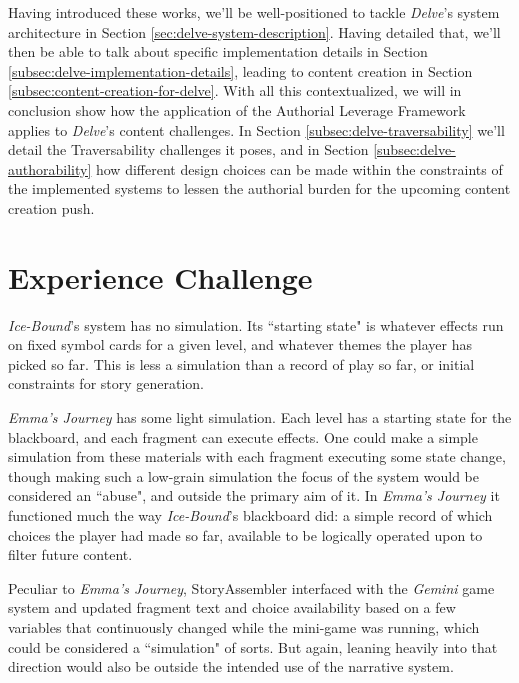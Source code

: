 Having introduced these works, we'll be well-positioned to tackle \textit{Delve}'s system architecture in Section \ref{sec:delve-system-description}. Having detailed that, we'll then be able to talk about specific implementation details in Section \ref{subsec:delve-implementation-details}, leading to content creation in Section \ref{subsec:content-creation-for-delve}. With all this contextualized, we will in conclusion show how the application of the Authorial Leverage Framework applies to \textit{Delve}'s content challenges. In Section \ref{subsec:delve-traversability} we'll detail the Traversability challenges it poses, and in Section \ref{subsec:delve-authorability} how different design choices can be made within the constraints of the implemented systems to lessen the authorial burden for the upcoming content creation push.

\section{Experience Challenge}\label{sec:delve-experience-challenge}

\textit{Ice-Bound}'s system has no simulation. Its ``starting state" is whatever effects run on fixed symbol cards for a given level, and whatever themes the player has picked so far. This is less a simulation than a record of play so far, or initial constraints for story generation.

\textit{Emma's Journey} has some light simulation. Each level has a starting state for the blackboard, and each fragment can execute effects. One could make a simple simulation from these materials with each fragment executing some state change, though making such a low-grain simulation the focus of the system would be considered an ``abuse", and outside the primary aim of it. In \textit{Emma's Journey} it functioned much the way \textit{Ice-Bound}'s blackboard did: a simple record of which choices the player had made so far, available to be logically operated upon to filter future content. 

Peculiar to \textit{Emma's Journey}, StoryAssembler interfaced with the \textit{Gemini} game system \cite{summerville2018Gemini} and updated fragment text and choice availability based on a few variables that continuously changed while the mini-game was running, which could be considered a ``simulation" of sorts. But again, leaning heavily into that direction would also be outside the intended use of the narrative system.

